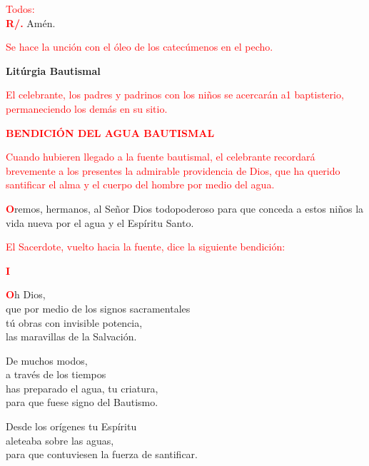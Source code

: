 \documentclass[12pt, letterpaper, spanish]{article}
\begin{document}
  \large {\textcolor{red}{Todos:}}\\
  \Large {\bfseries \textcolor{red}{R/.}} \hspace{0.5cm} Am\'en.

  \large {\textcolor{red}{Se hace la unci\'on con el \'oleo de los catec\'umenos en el pecho.}}

  \clearpage

  \begin{center}
    \Huge {\bfseries Lit\'urgia Bautismal}
  \end{center}

  \large {\textcolor{red}{El celebrante, los padres y padrinos con los ni\~nos se acercar\'an a1 baptisterio, permaneciendo los dem\'as en su sitio.}} 

  \Large {\bfseries \textcolor{red}{BENDICI\'ON DEL AGUA BAUTISMAL}} 

  \large {\textcolor{red}{Cuando hubieren llegado a la fuente bautismal, el celebrante recordar\'a brevemente a los presentes la admirable providencia de Dios, que ha querido santificar el alma y el cuerpo del hombre por medio del agua.}} 

  \lettrine[lines=2]{\bfseries \textcolor{red}{O}}{}\Large remos, hermanos, al Se\~nor Dios todopoderoso para que conceda a estos ni\~nos la vida nueva por el agua y el Esp\'iritu Santo.

  \large {\textcolor{red}{El Sacerdote, vuelto hacia la fuente, dice la siguiente bendici\'on:}}

  \begin{center}
    \Large {\bfseries \textcolor{red}{I}} 
  \end{center}

  \lettrine[lines=2]{\bfseries \textcolor{red}{O}}{}\Large h Dios,\\ 
  que por medio de los signos sacramentales\\ 
  t\'u obras con invisible potencia,\\ 
  las maravillas de la Salvaci\'on.

  \noindent
  De muchos modos,\\ 
  a trav\'es de los tiempos\\ 
  has preparado el agua, tu criatura,\\ 
  para que fuese signo del Bautismo.

  \noindent
  Desde los or\'igenes tu Esp\'iritu\\ 
  aleteaba sobre las aguas,\\ 
  para que contuviesen la fuerza de santificar.
\end{document}
